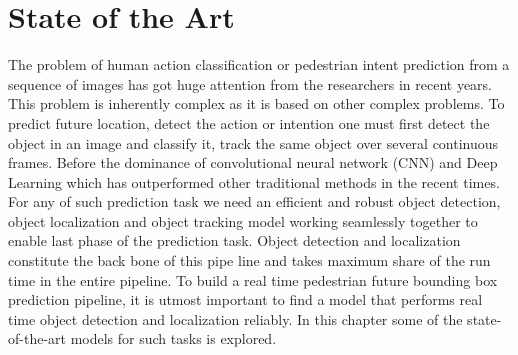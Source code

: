 \chapter{State of the Art}








The problem of human action classification or pedestrian intent prediction from a sequence of images has got huge attention from the researchers in recent years. This problem is inherently complex as it is based on other complex problems. To predict future location, detect the action or intention one must first detect the object in an image and classify it, track the same object over several continuous frames. Before the dominance of convolutional neural network (CNN) and Deep Learning which has outperformed other traditional methods in the recent times. For any of such prediction task we need an efficient and robust object detection, object localization and object tracking model working seamlessly together to enable last phase of the prediction task. Object detection and localization constitute the back bone of this pipe line and takes maximum share of the run time in the entire pipeline. To build a real time pedestrian future bounding box prediction pipeline, it is utmost important to find a model that performs real time object detection and localization reliably. In this chapter some of the state-of-the-art models for such tasks is explored.


